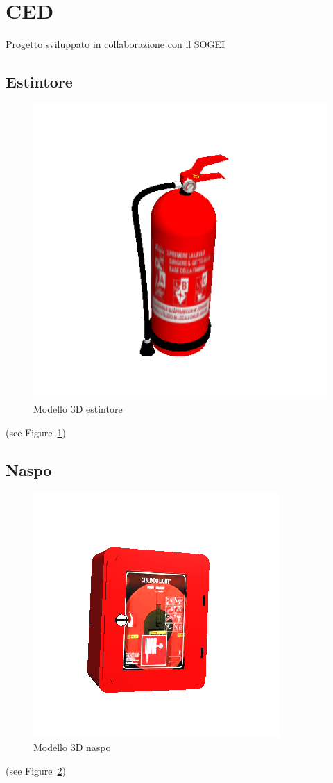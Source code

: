 \section{CED}
\label{sec:chapter_4_section_2}
Progetto sviluppato in collaborazione con il SOGEI

\subsection*{Estintore}
\begin{figure}[htbp] %
   \centering
   \includegraphics[width=0.5\linewidth]{images/estintore}
   \caption{Modello 3D estintore}
   \label{fig:estintore}
   \end{figure}
   (see Figure~\ref{fig:estintore})
   \newpage

\subsection*{Naspo}
\begin{figure}[htbp] %
   \centering
   \includegraphics[width=0.5\linewidth]{images/naspo}
   \caption{Modello 3D naspo}
   \label{fig:naspo}
   \end{figure}
   (see Figure~\ref{fig:naspo})
   \newpage

